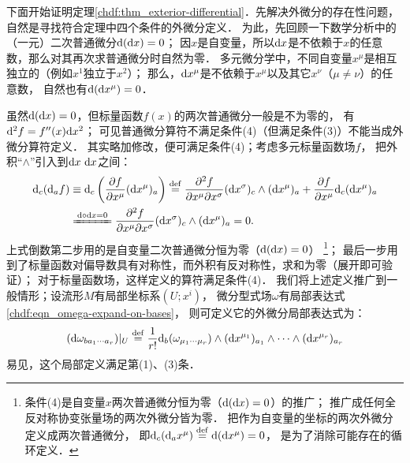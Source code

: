 下面开始证明定理\ref{chdf:thm_exterior-differential}．先解决外微分的存在性问题，
自然是寻找符合定理中四个条件的外微分定义．
为此，先回顾一下数学分析中的（一元）二次普通微分${\rm d}({\rm d}x)=0$；
因$x$是自变量，所以${\rm d}x$是不依赖于$x$的任意数，那么对其再次求普通微分时自然为零．
多元微分学中，不同自变量$x^\mu$是相互独立的（例如$x^1$独立于$x^2$）；
那么，${\rm d}x^\mu$是不依赖于$x^\mu$以及其它$x^\nu$（$\mu \neq \nu$）的任意数，
自然也有${\rm d}({\rm d}x^\mu)=0$．

虽然${\rm d}({\rm d}x)=0$，但标量函数$f(x)$的两次普通微分一般是不为零的，
有${\rm d}^2f=f''(x) {\rm d}x^2$；
可见普通微分算符不满足条件(4)（但满足条件(3)）不能当成外微分算符定义．
其实略加修改，便可满足条件(4)；考虑多元标量函数场$f$，
把外积“$\wedge$”引入到${\rm d}x\ {\rm d}x$之间：
\begin{align}
    {\rm d}_{c}({\rm d}_{a}f)&\equiv {\rm d}_{c}\left(\frac{\partial f}{\partial x^\mu} ({\rm d}x^{\mu})_{a}\right)
    \overset{\mathrm {def}}{=}\frac{\partial^2 f}{\partial x^\mu \partial x^\sigma}
    ({\rm d}x^{\sigma})_{c}\wedge ({\rm d}x^{\mu})_{a} +
    \frac{\partial f}{\partial x^\mu} {\rm d}_{c}({\rm d}x^{\mu})_{a} \notag \\
    &\xlongequal{{\rm d}\circ{\rm d}x=0}
    \frac{\partial^2 f}{\partial x^\mu \partial x^\sigma}
    ({\rm d}x^{\sigma})_{c}\wedge ({\rm d}x^{\mu})_{a} = 0. \label{chdf:eqn_ddf=0}
\end{align}
上式倒数第二步用的是自变量二次普通微分恒为零（${\rm d}({\rm d}x)=0$）
{\footnote{条件(4)是自变量$x$两次普通微分恒为零（${\rm d}({\rm d}x)=0$）的推广；
    推广成任何全反对称协变张量场的两次外微分皆为零．
    把作为自变量的坐标的两次外微分定义成两次普通微分，
即${\rm d}_{c}({\rm d}_{a}x^\mu) \overset{\mathrm {def}}{=} {\rm d}({\rm d}x^\mu) =0$，
是为了消除可能存在的循环定义．}}；
最后一步用到了标量函数对偏导数具有对称性，而外积有反对称性，求和为零（展开即可验证）；
对于标量函数场，这样定义的算符满足条件(4)．
我们将上述定义推广到一般情形；设流形$M$有局部坐标系$(U;x^i)$，
微分型式场$\omega$有局部表达式\eqref{chdf:eqn_omega-expand-on-bases}，
则可定义它的外微分局部表达式为：
\begin{equation}\label{chdf:eqn_exterior-differential}
    ({\rm d}\omega_{b a_{1}\cdots a_{r}})|_U \overset{\mathrm {def}}{=}
    \frac{1}{r!} {\rm d}_{b}(\omega_{\mu_{1}\cdots \mu_{r}}) \wedge
    ({\rm d}x^{\mu_1})_{a_{1}} \wedge\cdots\wedge ({\rm d}x^{\mu_r})_{a_{r}}
\end{equation}
易见，这个局部定义满足第(1)、(3)条．


